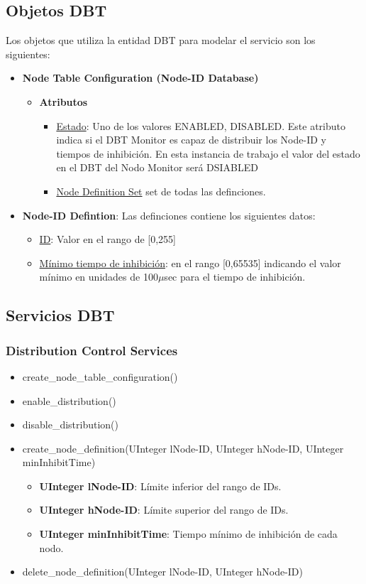 \subsection{Objetos DBT}
Los objetos que utiliza la entidad DBT para modelar el servicio son los
siguientes:
\begin{itemize}
\item \textbf{Node Table Configuration (Node-ID Database)}
  \begin{itemize}
  \item \textbf{Atributos}
    \begin{itemize}
    \item \underline{Estado}: Uno de los valores {ENABLED, DISABLED}. Este
      atributo indica si el DBT Monitor es capaz de distribuir los Node-ID
      y tiempos de inhibición. En esta instancia de trabajo el valor del estado
      en el DBT del Nodo Monitor será DSIABLED
      \item \underline{Node Definition Set} set de todas las definciones. 
    \end{itemize}
  \end{itemize}

\item \textbf{Node-ID Defintion}:
  Las definciones contiene los siguientes datos:
  \begin{itemize}
  \item \underline{ID}: Valor en el rango de [0,255]
  \item \underline{Mínimo tiempo de inhibición}: en el rango [0,65535] indicando
    el valor mínimo en unidades de 100$\mu$sec para el tiempo de inhibición.
  \end{itemize}
  
\end{itemize}

\subsection{Servicios DBT}
\subsubsection{Distribution Control Services}
\begin{itemize}
  \item create\_node\_table\_configuration()
  \item enable\_distribution()
  \item disable\_distribution()
  \item create\_node\_definition(UInteger lNode-ID, UInteger hNode-ID, UInteger minInhibitTime)
    \begin{itemize}
    \item \textbf{UInteger lNode-ID}: Límite inferior del rango de IDs.
    \item \textbf{UInteger hNode-ID}: Límite superior del rango de IDs.
    \item \textbf{UInteger minInhibitTime}: Tiempo mínimo de inhibición de cada
      nodo.
    \end{itemize}
  \item delete\_node\_definition(UInteger lNode-ID, UInteger hNode-ID)
\end{itemize}

